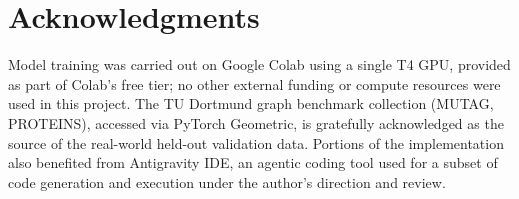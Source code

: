 \documentclass[11pt,letterpaper]{article}
\numberwithin{equation}{section}
\numberwithin{figure}{section}
\numberwithin{table}{section}
\begin{document}
\section*{Acknowledgments}
Model training was carried out on Google Colab using a single T4 GPU, provided as part of Colab's free tier; no other external funding or compute resources were used in this project. The TU Dortmund graph benchmark collection (MUTAG, PROTEINS), accessed via PyTorch Geometric, is gratefully acknowledged as the source of the real-world held-out validation data. Portions of the implementation also benefited from Antigravity IDE, an agentic coding tool used for a subset of code generation and execution under the author's direction and review.

\end{document}
